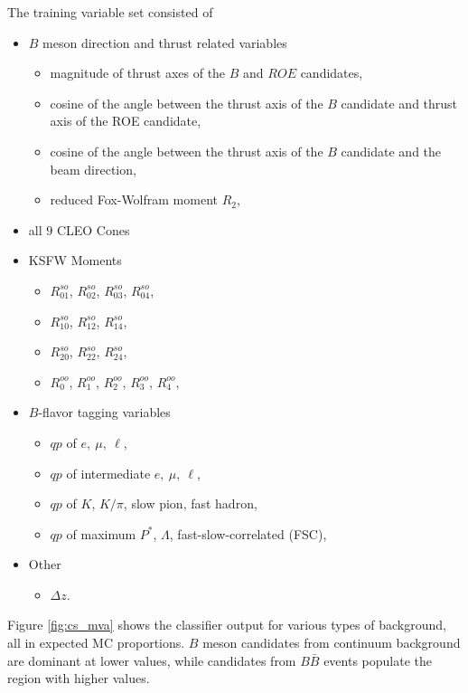 The training variable set consisted of
\begin{itemize}
	\item $B$ meson direction and thrust related variables
	\begin{itemize}
		\item magnitude of thrust axes of the $B$ and $ROE$ candidates,
		\item cosine of the angle between the thrust axis of the $B$ candidate and thrust axis of the ROE candidate,
		\item cosine of the angle between the thrust axis of the $B$ candidate and the beam direction,
		\item reduced Fox-Wolfram moment $R_2 $,
	\end{itemize}
	\item all $9$ CLEO Cones
	\item KSFW Moments
	\begin{itemize}
		\item $R^{so}_{01}$, $R^{so}_{02}$, $R^{so}_{03}$, $R^{so}_{04}$,
		\item $R^{so}_{10}$, $R^{so}_{12}$, $R^{so}_{14}$,
		\item $R^{so}_{20}$, $R^{so}_{22}$, $R^{so}_{24}$,
		\item $R^{oo}_{0}$, $R^{oo}_{1}$, $R^{oo}_{2}$, $R^{oo}_{3}$, $R^{oo}_{4}$,
	\end{itemize}
	\item $B$-flavor tagging variables
	\begin{itemize}
		\item $qp$ of $e,~\mu,~\ell$,
		\item $qp$ of intermediate $e,~\mu,~\ell$,
		\item $qp$ of $K$, $K/\pi$, slow pion, fast hadron,
		\item $qp$ of maximum $P^*$, $\Lambda$, fast-slow-correlated (FSC),
	\end{itemize}
	\item Other
	\begin{itemize}
		\item $\Delta z$.
	\end{itemize}
\end{itemize}

Figure \ref{fig:cs_mva} shows the classifier output for various types of background, all in expected MC proportions. $B$ meson candidates from continuum background are dominant at lower values, while candidates from $B \bar B$ events populate the region with higher values.

